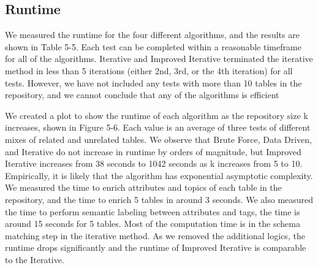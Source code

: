 \subsection{Runtime}

We measured the runtime for the four different algorithms, and the results are shown in Table 5-5. Each test can be completed within a reasonable timeframe for all of the algorithms. Iterative and Improved Iterative terminated the iterative method in less than 5 iterations (either 2nd, 3rd, or the 4th iteration) for all tests. However, we have not included any tests with more than 10 tables in the repository, and we cannot conclude that any of the algorithms is efficient

We created a plot to show the runtime of each algorithm as the repository size k increases, shown in Figure 5-6. Each value is an average of three tests of different mixes of related and unrelated tables. We observe that Brute Force, Data Driven, and Iterative do not increase in runtime by orders of magnitude, but Improved Iterative increases from 38 seconds to 1042 seconds as k increases from 5 to 10. Empirically, it is likely that the algorithm has exponential asymptotic complexity. We measured the time to enrich attributes and topics of each table in the repository, and the time to enrich 5 tables in around 3 seconds. We also measured the time to perform semantic labeling between attributes and tags, the time is around 15 seconds for 5 tables. Most of the computation time is in the schema matching step in the iterative method. As we removed the additional logics, the runtime drops significantly and the runtime of Improved Iterative is comparable to the Iterative.

